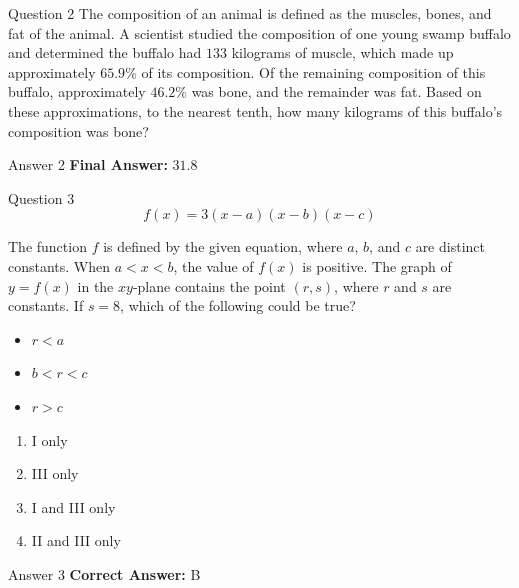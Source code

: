 \documentclass{beamer}
\begin{document}
\begin{frame}{Question 2}
\small
The composition of an animal is defined as the muscles, bones, and fat of the animal. A scientist studied the composition of one young swamp buffalo and determined the buffalo had $133$ kilograms of muscle, which made up approximately $65.9\%$ of its composition. Of the remaining composition of this buffalo, approximately $46.2\%$ was bone, and the remainder was fat. Based on these approximations, to the nearest tenth, how many kilograms of this buffalo's composition was bone?
\end{frame}
\begin{frame}{Answer 2}
\small
\textbf{Final Answer:} $\boxed{31.8}$
\end{frame}

\begin{frame}{Question 3}
\small
\[f(x) = 3(x-a)(x-b)(x-c)\]


The function $f$ is defined by the given equation, where $a$, $b$, and $c$ are distinct constants. When $a < x < b$, the value of $f(x)$ is positive. The graph of $y = f(x)$ in the $xy$-plane contains the point $(r, s)$, where $r$ and $s$ are constants. If $s = 8$, which of the following could be true?

\begin{itemize}
\item[I.] $r < a$
\item[II.] $b < r < c$
\item[III.] $r > c$
\end{itemize}
\vspace{0.35cm}
\begin{enumerate}
    \item[A.] I only
    \item[B.] III only
    \item[C.] I and III only
    \item[D.] II and III only
\end{enumerate}
\end{frame}
\begin{frame}{Answer 3}
\small
\textbf{Correct Answer:} B
\end{frame}
\end{document}
